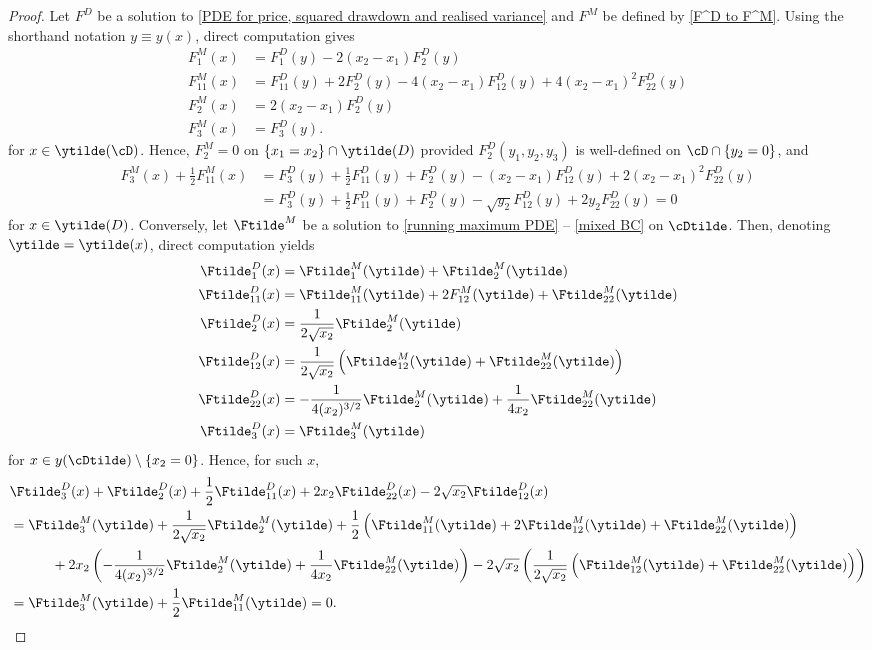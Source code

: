 \documentclass[11pt]{article}
\begin{document}
\begin{proof}

Let $F^D$ be a solution to \eqref{PDE for price, squared drawdown and realised variance} and $F^M$ be defined by \eqref{F^D to F^M}. Using the shorthand notation $y \equiv y(x)$, direct computation gives
\begin{align*}
F^M_1(x) &= F^D_1(y) - 2(x_2 - x_1) F^D_2(y) \\
F^M_{11}(x) &= F^D_{11}(y) + 2 F^D_2(y) - 4 (x_2 - x_1) F^D_{12}(y) + 4 (x_2 - x_1)^2 F^D_{22}(y) \\
F^M_{2}(x) &= 2 (x_2 - x_1) F^D_2(y) \\
F^M_3(x) &= F^D_3(y).
\end{align*}
for $x \in \ytilde(\cD)$. Hence, $F^M_2 = 0$ on $\{x_1 = x_2\} \cap \ytilde(D)$ provided $F^D_2(y_1, y_2, y_3)$ is well-defined on $\cD \cap \{ y_2 = 0 \}$, and
\begin{align*}
F^M_3(x) + \frac{1}{2} F^M_{11}(x) &= F^D_3(y) + \frac{1}{2} F^D_{11}(y) + F^D_2(y) - (x_2 - x_1) F^D_{12}(y) + 2 (x_2 - x_1)^2 F^D_{22}(y) \\
&=   F^D_3(y) + \frac{1}{2} F^D_{11}(y) + F^D_2(y) - \sqrt{y_2} F^D_{12}(y) + 2 y_2 F^D_{22}(y) = 0
\end{align*}
for $x \in \ytilde(D)$. Conversely, let $\Ftilde^M$ be a solution to \eqref{running maximum PDE} -- \eqref{mixed BC} on $\cDtilde$. Then, denoting $\ytilde = \ytilde(x)$, direct computation yields
\begin{align*}
\Ftilde^D_1(x) &= \Ftilde^M_1(\ytilde) + \Ftilde^M_2(\ytilde) \\
\Ftilde^D_{11}(x) &= \Ftilde^M_{11}(\ytilde) + 2 F^M_{12}(\ytilde) + \Ftilde^M_{22}(\ytilde) \\
\Ftilde^D_2(x) &= \frac{1}{2 \sqrt{x_2}} \Ftilde^M_2(\ytilde) \\
\Ftilde^D_{12}(x) &= \frac{1}{2 \sqrt{x_2}} \left(\Ftilde^M_{12}(\ytilde) + \Ftilde^M_{22}(\ytilde) \right) \\
\Ftilde^D_{22}(x) &= - \frac{1}{4 (x_2)^{3/2}} \Ftilde^M_2(\ytilde) + \frac{1}{4 x_2} \Ftilde^M_{22}(\ytilde) \\
\Ftilde^D_3(x) &= \Ftilde^M_3(\ytilde)
\end{align*}
for $x \in y({\cDtilde}) \setminus \{x_2 = 0\}$. Hence, for such $x$,
\begin{align*}
&\Ftilde^D_3(x) + \Ftilde^D_2(x) + \frac{1}{2} \Ftilde^D_{11}(x) + 2 x_2 \Ftilde^D_{22}(x) - 2 \sqrt{x_2} \Ftilde^D_{12}(x) \\
& = \Ftilde^M_3(\ytilde) + \frac{1}{2 \sqrt{x_2}} \Ftilde^M_2 (\ytilde) + \frac{1}{2} \left( \Ftilde^M_{11}(\ytilde) + 2 \Ftilde^M_{12}(\ytilde) + \Ftilde^M_{22}(\ytilde) \right) \\
&\quad\quad\quad + 2 x_2 \left( - \frac{1}{4 (x_2)^{3/2}} \Ftilde^M_2(\ytilde) + \frac{1}{4 x_2} \Ftilde^M_{22}(\ytilde) \right) - 2 \sqrt{x_2} \left( \frac{1}{2 \sqrt{x_2}} \left(\Ftilde^M_{12}(\ytilde) + \Ftilde^M_{22}(\ytilde) \right) \right) \\
&= \Ftilde^M_3(\ytilde) + \frac{1}{2} \Ftilde^M_{11}(\ytilde) = 0.
\end{align*}

\end{proof}
\end{document}
